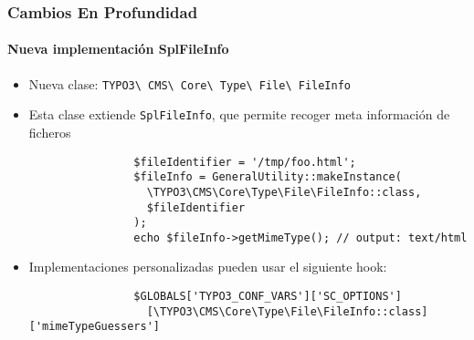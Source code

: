 
\begin{frame}[fragile]
	\frametitle{Cambios En Profundidad}
	\framesubtitle{Nueva implementación SplFileInfo}

	\lstset{basicstyle=\smaller\ttfamily}

	\begin{itemize}

		\item Nueva clase:
			\texttt{TYPO3\textbackslash
				CMS\textbackslash
				Core\textbackslash
				Type\textbackslash
				File\textbackslash
				FileInfo}

		\item Esta clase extiende \texttt{SplFileInfo}, que permite recoger meta información de ficheros

			\begin{lstlisting}
				$fileIdentifier = '/tmp/foo.html';
				$fileInfo = GeneralUtility::makeInstance(
				  \TYPO3\CMS\Core\Type\File\FileInfo::class,
				  $fileIdentifier
				);
				echo $fileInfo->getMimeType(); // output: text/html
			\end{lstlisting}

		\item Implementaciones personalizadas pueden usar el siguiente hook:

			\begin{lstlisting}
				$GLOBALS['TYPO3_CONF_VARS']['SC_OPTIONS']
				  [\TYPO3\CMS\Core\Type\File\FileInfo::class]['mimeTypeGuessers']
			\end{lstlisting}

	\end{itemize}

\end{frame}


